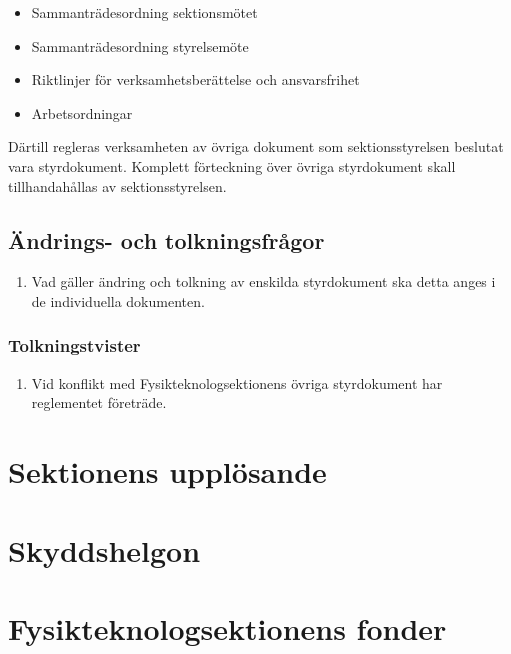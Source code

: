 \documentclass[11pt,a4paper]{article}
\begin{document}
\begin{itemize}
\item Sammanträdesordning sektionsmötet
\item Sammanträdesordning styrelsemöte
\item Riktlinjer för verksamhetsberättelse och ansvarsfrihet
\item Arbetsordningar
\end{itemize}

Därtill regleras verksamheten av övriga dokument som sektionsstyrelsen beslutat vara styrdokument. Komplett förteckning över övriga styrdokument skall tillhandahållas av sektionsstyrelsen.

\subsection{Ändrings- och tolkningsfrågor}

\begin{enumerate}[\thesubsection .1]
\item Vad gäller ändring och tolkning av enskilda styrdokument ska detta anges i de individuella dokumenten.

\end{enumerate}

\subsubsection{Tolkningstvister}

\begin{enumerate}[\thesubsection .1]

  \item Vid konflikt med Fysikteknologsektionens övriga styrdokument har reglementet företräde.

\end{enumerate}


\newpage

\section{Sektionens upplösande}
\section{Skyddshelgon}


\section{Fysikteknologsektionens fonder}
\end{document}
